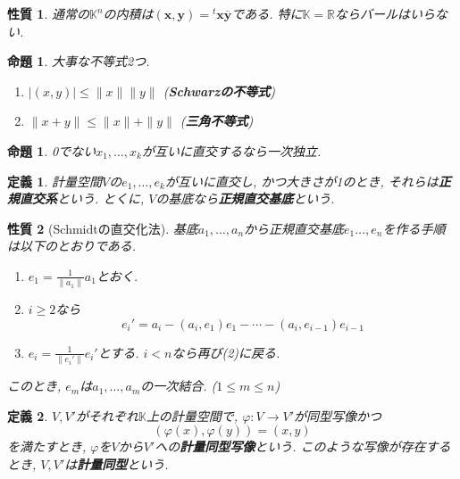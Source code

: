 \documentclass[a4j,dvipdfmx]{jsarticle}
\newcommand{\R}{\mathbb{R}}
\newcommand{\K}{\mathbb{K}}
\newcommand{\trans}{{}^t}
\theoremstyle{mystyle}
\newtheorem*{definition}{定義}
\newtheorem{proposition}[theorem]{命題}
\newtheorem*{property}{性質}
\begin{document}
    \begin{property}
        通常の$\K^n$の内積は$(\bm{x},\bm{y})=\trans\bm{x}\overline{\bm{y}}$である. 特に$\K=\R$ならバールはいらない.
    \end{property}
    \begin{proposition} 大事な不等式2つ.
        \begin{enumerate}
            \item $|(x,y)|\leq \|x\|\|y\|$ \hfill(\textbf{Schwarzの不等式})
            \item $\|x+y\|\leq \|x\|+\|y\|$ \hfill(\textbf{三角不等式})
        \end{enumerate}
    \end{proposition}
    \begin{proposition}
        0でない$x_1,\dots,x_k$が互いに直交するなら一次独立.
    \end{proposition}
    \begin{definition}
        計量空間$V$の$e_1,\dots,e_k$が互いに直交し, かつ大きさが1のとき, それらは\textbf{正規直交系}という. とくに, $V$の基底なら\textbf{正規直交基底}という.
    \end{definition}
    \begin{property}[Schmidtの直交化法]
        基底$a_1,\dots,a_n$から正規直交基底$e_1\dots,e_n$を作る手順は以下のとおりである.
        \begin{enumerate}
            \item $\displaystyle e_1=\frac{1}{\|a_1\|} a_1$とおく.
            \item $i\geq 2$なら
            \begin{equation*}
                e_i'=a_i-(a_i,e_1)e_1-\cdots - (a_i,e_{i-1})e_{i-1}
            \end{equation*}
            \item $\displaystyle e_i=\frac{1}{\|e_i'\|} e_i'$とする. $i< n$なら再び(2)に戻る.
        \end{enumerate}
        このとき, $e_{m}$は$a_1,\dots,a_{m}$の一次結合. ($1\leq m\leq n$)
    \end{property}
    \begin{definition}
        $V,V'$がそれぞれ$\K$上の計量空間で, $\varphi:V\to V'$が同型写像かつ
        \begin{equation*}
            (\varphi(x),\varphi(y))=(x,y)
        \end{equation*}
        を満たすとき, $\varphi$を$V$から$V'$への\textbf{計量同型写像}という. このような写像が存在するとき, $V,V'$は\textbf{計量同型}という.
    \end{definition}
\end{document}
